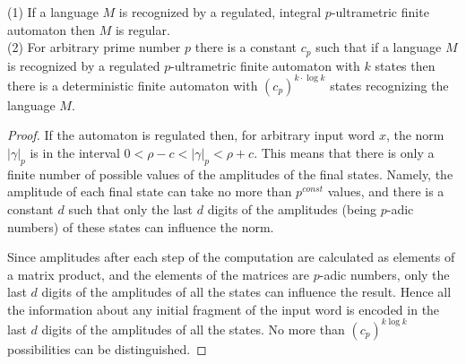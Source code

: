 \documentclass{llncs}
\begin{document}
\begin{theorem}
(1) If a language $M$ is recognized by a regulated, integral $p$-ultrametric finite automaton then $M$ is regular.\\
(2) For arbitrary prime number $p$ there is a constant $c_p$ such that if a language $M$ is recognized by a regulated $p$-ultrametric finite automaton with $k$ states then there is a deterministic finite automaton with $(c_p)^{k\cdot \log k}$ states recognizing the language $M$.
\end{theorem}
\begin{proof}
If the automaton is regulated then, for arbitrary input word $x$, the norm  $|\gamma |_p$ is in the interval $0 < \rho -c < |\gamma |_p < \rho +c$. This means that there is only a finite number of possible values of the amplitudes of the final states. Namely, the amplitude of each final state can take no more than $p^{const}$ values, and there is a constant $d$ such that only the last $d$ digits of the amplitudes (being $p$-adic numbers) of these states can influence  the norm.

Since amplitudes after each step of the computation are calculated as elements of a matrix product, and the elements of the matrices are $p$-adic numbers, only the last $d$ digits of the amplitudes of all the states can influence the result. Hence all the information about any initial fragment of the input word is encoded in the last $d$ digits of the amplitudes of all the states. No more than $(c_p)^{k\log k}$ possibilities can be distinguished.
\end{proof}
\end{document}
